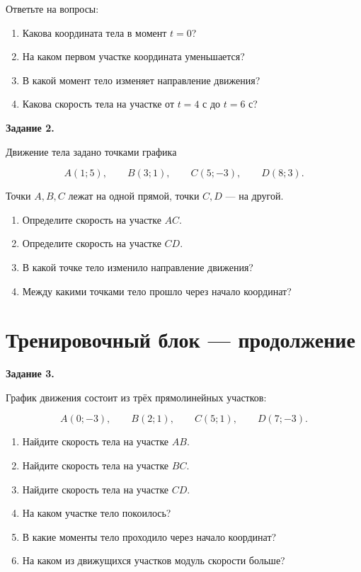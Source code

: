 \documentclass[a4paper,12pt]{article}
\begin{document}
Ответьте на вопросы:

\begin{enumerate}[label=\alph*)]
  \item Какова координата тела в момент \(t=0\)?
  \item На каком первом участке координата уменьшается?
  \item В какой момент тело изменяет направление движения?
  \item Какова скорость тела на участке от \(t=4\) с до \(t=6\) с?
\end{enumerate}

\vspace{0.8cm}

\textbf{Задание 2.}

Движение тела задано точками графика

\[
A(1;5),\qquad
B(3;1),\qquad
C(5;-3),\qquad
D(8;3).
\]

Точки \(A,B,C\) лежат на одной прямой, точки \(C,D\) --- на другой.

\begin{enumerate}[label=\alph*)]
  \item Определите скорость на участке \(AC\).
  \item Определите скорость на участке \(CD\).
  \item В какой точке тело изменило направление движения?
  \item Между какими точками тело прошло через начало координат?
\end{enumerate}

\clearpage

\section*{Тренировочный блок --- продолжение}

\textbf{Задание 3.}

График движения состоит из трёх прямолинейных участков:

\[
A(0;-3),\qquad
B(2;1),\qquad
C(5;1),\qquad
D(7;-3).
\]

\begin{enumerate}[label=\alph*)]
  \item Найдите скорость тела на участке \(AB\).
  \item Найдите скорость тела на участке \(BC\).
  \item Найдите скорость тела на участке \(CD\).
  \item На каком участке тело покоилось?
  \item В какие моменты тело проходило через начало координат?
  \item На каком из движущихся участков модуль скорости больше?
\end{enumerate}
\end{document}
